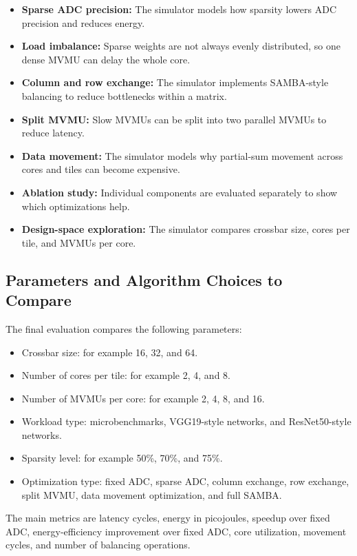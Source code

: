 \documentclass[11pt]{article}
\begin{document}
\begin{itemize}
    \item \textbf{Sparse ADC precision:} The simulator models how sparsity lowers ADC precision and reduces energy.
    \item \textbf{Load imbalance:} Sparse weights are not always evenly distributed, so one dense MVMU can delay the whole core.
    \item \textbf{Column and row exchange:} The simulator implements SAMBA-style balancing to reduce bottlenecks within a matrix.
    \item \textbf{Split MVMU:} Slow MVMUs can be split into two parallel MVMUs to reduce latency.
    \item \textbf{Data movement:} The simulator models why partial-sum movement across cores and tiles can become expensive.
    \item \textbf{Ablation study:} Individual components are evaluated separately to show which optimizations help.
    \item \textbf{Design-space exploration:} The simulator compares crossbar size, cores per tile, and MVMUs per core.
\end{itemize}

\subsection{Parameters and Algorithm Choices to Compare}

The final evaluation compares the following parameters:

\begin{itemize}
    \item Crossbar size: for example 16, 32, and 64.
    \item Number of cores per tile: for example 2, 4, and 8.
    \item Number of MVMUs per core: for example 2, 4, 8, and 16.
    \item Workload type: microbenchmarks, VGG19-style networks, and ResNet50-style networks.
    \item Sparsity level: for example 50\%, 70\%, and 75\%.
    \item Optimization type: fixed ADC, sparse ADC, column exchange, row exchange, split MVMU, data movement optimization, and full SAMBA.
\end{itemize}

The main metrics are latency cycles, energy in picojoules, speedup over fixed ADC, energy-efficiency improvement over fixed ADC, core utilization, movement cycles, and number of balancing operations.
\end{document}
